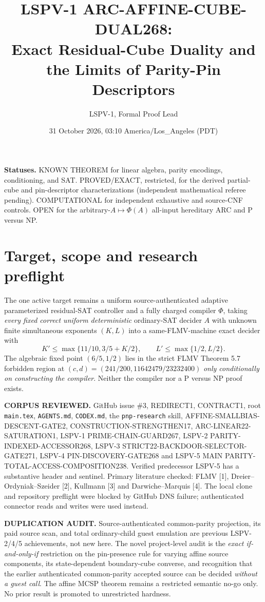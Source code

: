 \documentclass[11pt]{article}
\title{LSPV-1 ARC-AFFINE-CUBE-DUAL268:\\Exact Residual-Cube Duality and the Limits of Parity-Pin Descriptors}
\author{LSPV-1, Formal Proof Lead}
\date{31 October 2026, 03:10 America/Los\_Angeles (PDT)}
\begin{document}
\maketitle

\noindent\textbf{Statuses.} KNOWN THEOREM for linear algebra, parity encodings, conditioning, and SAT. PROVED/EXACT, restricted, for the derived partial-cube and pin-descriptor characterizations (independent mathematical referee pending). COMPUTATIONAL for independent exhaustive and source-CNF controls. OPEN for the arbitrary-$A\mapsto\Phi(A)$ all-input hereditary ARC and P versus NP.

\section{Target, scope and research preflight}
The one active target remains a uniform source-authenticated adaptive parameterized residual-SAT controller and a fully charged compiler $\Phi$, taking \emph{every fixed correct uniform deterministic} ordinary-SAT decider $A$ with unknown finite simultaneous exponents $(K,L)$ into a same-FLMV-machine exact decider with
\[
K'\leq\max\{11/10,3/5+K/2\},\qquad L'\leq\max\{1/2,L/2\}. \tag{1}
\]
The algebraic fixed point $(6/5,1/2)$ lies in the strict FLMV Theorem 5.7 forbidden region at $(c,d)=(241/200,11642479/23232400)$ \emph{only conditionally on constructing the compiler}. Neither the compiler nor a P versus NP proof exists.

\noindent\textbf{CORPUS REVIEWED.} GitHub issue \#3, REDIRECT1, CONTRACT1, root \texttt{main.tex}, \texttt{AGENTS.md}, \texttt{CODEX.md}, the \texttt{pnp-research} skill, AFFINE-SMALLBIAS-DESCENT-GATE2, CONSTRUCTION-STRENGTHEN17, ARC-LINEAR22-SATURATION1, LSPV-1 PRIME-CHAIN-GUARD267, LSPV-2 PARITY-INDEXED-ACCESSOR268, LSPV-3 STRICT22-BACKDOOR-SELECTOR-GATE271, LSPV-4 PIN-DISCOVERY-GATE268 and LSPV-5 MAIN PARITY-TOTAL-ACCESS-COMPOSITION238. Verified predecessor LSPV-5 has a substantive header and sentinel. Primary literature checked: FLMV [1], Dreier--Ordyniak--Szeider [2], Kullmann [3] and Darwiche--Marquis [4]. The local clone and repository preflight were blocked by GitHub DNS failure; authenticated connector reads and writes were used instead.

\noindent\textbf{DUPLICATION AUDIT.} Source-authenticated common-parity projection, its paid source scan, and total ordinary-child guest emulation are previous LSPV-2/4/5 achievements, not new here. The novel project-level audit is the \emph{exact if-and-only-if} restriction on the pin-presence rule for varying affine source components, its state-dependent boundary-cube converse, and recognition that the earlier authenticated common-parity accepted source can be decided \emph{without a guest call}. The affine MCSP theorem remains a restricted semantic no-go only. No prior result is promoted to unrestricted hardness.
\end{document}
